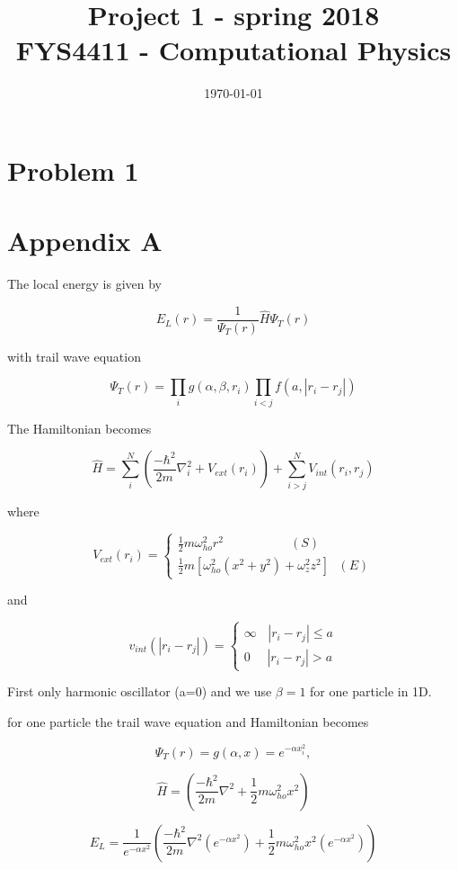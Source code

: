 \documentclass[a4paper,10pt,twoside]{report}
\date{\today}
\title{Project 1 - spring 2018\\
	\normalsize FYS4411 - Computational Physics}
\author{}
\begin{document}
\raggedright
\maketitle
\newpage


\section*{Problem 1}



\appendix
\section*{Appendix A}

The local energy is given by

$$E_L(r)=\frac{1}{\Psi_T(r)}\hat{H}\Psi_T(r)$$

with trail wave equation

$$\Psi_T(r) = \prod_{i} g(\alpha, \beta, r_i) \prod_{i<j} f(a, |r_i - r_j|)$$

The Hamiltonian becomes

$$\hat{H} = \sum_{i}^{N} \left( \frac{-\hbar^2}{2m} \nabla_i^2 + V_{ext}(r_i)\right) + \sum_{i>j}^{N} V_{int}(r_i, r_j)$$

where  

$$
V_{ext}(r_i) = 
\begin{cases}
\frac{1}{2} m\omega_{ho}^2 r^2\ \ \ \ \ \ \ \ \ \ \ \ \ \ \ \ \ \ \ \ \ \ \ \ (S)\\
\frac{1}{2} m [\omega_{ho}^2(x^2+ y^2) + \omega_z^2 z^2]\ \ \  (E)
\end{cases}
$$

and

$$
v_{int}(|r_i - r_j|) = 
\begin{cases}
\infty \ \ \ \   |r_i - r_j| \le a \\
0 \ \ \ \ \ \ |r_i - r_j| > a
\end{cases}
$$


First only harmonic oscillator (a=0) and we use $\beta = 1$ for one particle in 1D.

for one particle the trail wave equation and Hamiltonian becomes

$$\Psi_T(r) = g(\alpha, x) = e^{-\alpha x_i^2},$$

$$\hat{H} = \left( \frac{-\hbar^2}{2m} \nabla^2 + \frac{1}{2} m\omega_{ho}^2 x^2\right)$$

$$E_L = \frac{1}{e^{-\alpha x^2}}\left( \frac{-\hbar^2}{2m} \nabla^2 (e^{-\alpha x^2}) + \frac{1}{2} m\omega_{ho}^2 x^2(e^{-\alpha x^2})\right)$$
\end{document}
